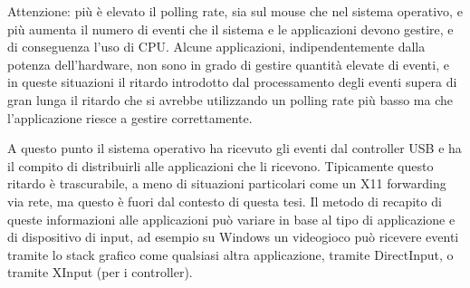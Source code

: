 Attenzione: più è elevato il polling rate, sia sul mouse che nel sistema operativo, e più aumenta il numero di eventi che il sistema e le applicazioni devono gestire, e di conseguenza l'uso di CPU. Alcune applicazioni, indipendentemente dalla potenza dell'hardware, non sono in grado di gestire quantità elevate di eventi, e in queste situazioni il ritardo introdotto dal processamento degli eventi supera di gran lunga il ritardo che si avrebbe utilizzando un polling rate più basso ma che l'applicazione riesce a gestire correttamente.

A questo punto il sistema operativo ha ricevuto gli eventi dal controller USB e ha il compito di distribuirli alle applicazioni che li ricevono. Tipicamente questo ritardo è trascurabile, a meno di situazioni particolari come un X11 forwarding via rete, ma questo è fuori dal contesto di questa tesi. Il metodo di recapito di queste informazioni alle applicazioni può variare in base al tipo di applicazione e di dispositivo di input, ad esempio su Windows un videogioco può ricevere eventi tramite lo stack grafico come qualsiasi altra applicazione, tramite DirectInput, o tramite XInput (per i controller).

